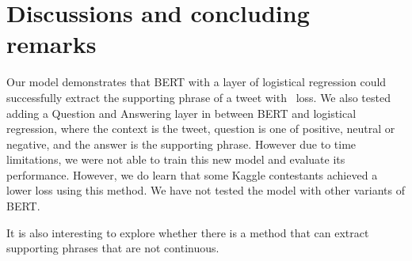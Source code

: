 \section{Discussions and concluding remarks} \label{sec:discussion}

Our model demonstrates that BERT with a layer of logistical regression could successfully extract the supporting phrase of a tweet with \score\ loss. We also tested adding a Question and Answering layer in between BERT and logistical regression, where the context is the tweet, question is one of positive, neutral or negative, and the answer is  the supporting phrase. However due to time limitations, we were not able to train this new model and evaluate its performance. However, we do learn that some Kaggle contestants achieved a lower loss using this method. We have not tested the model with other variants of BERT. 

It is also interesting to explore whether there is a method that can extract supporting phrases that are not continuous.